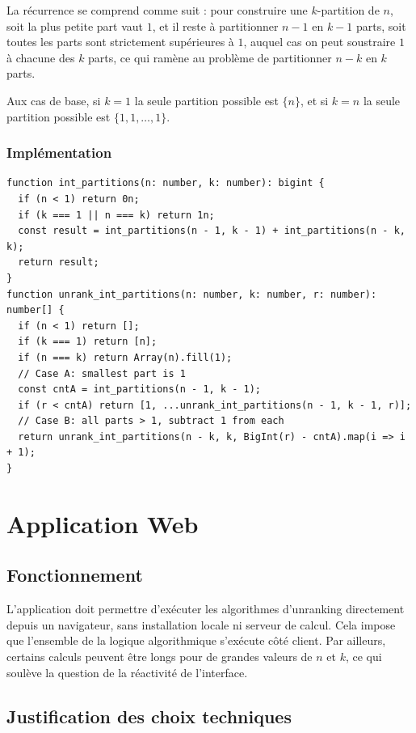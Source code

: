 \documentclass[12pt, a4paper]{report}
\begin{document}
La r\'ecurrence se comprend comme suit : pour construire une $k$-partition de $n$,
soit la plus petite part vaut $1$, et il reste \`a partitionner $n - 1$ en $k - 1$
parts, soit toutes les parts sont strictement sup\'erieures \`a $1$, auquel cas on
peut soustraire $1$ \`a chacune des $k$ parts, ce qui ram\`ene au probl\`eme de
partitionner $n - k$ en $k$ parts.

Aux cas de base, si $k = 1$ la seule partition possible est $\{n\}$, et si $k = n$
la seule partition possible est $\{1, 1, \ldots, 1\}$.

\subsection{Impl\'ementation}

\begin{verbatim}
function int_partitions(n: number, k: number): bigint {
  if (n < 1) return 0n;
  if (k === 1 || n === k) return 1n;
  const result = int_partitions(n - 1, k - 1) + int_partitions(n - k, k);
  return result;
}
function unrank_int_partitions(n: number, k: number, r: number): number[] {
  if (n < 1) return [];
  if (k === 1) return [n];
  if (n === k) return Array(n).fill(1);
  // Case A: smallest part is 1
  const cntA = int_partitions(n - 1, k - 1);
  if (r < cntA) return [1, ...unrank_int_partitions(n - 1, k - 1, r)];
  // Case B: all parts > 1, subtract 1 from each
  return unrank_int_partitions(n - k, k, BigInt(r) - cntA).map(i => i + 1);
}
\end{verbatim}

\chapter{Application Web}

\section{Fonctionnement}

L'application doit permettre d'ex\'ecuter les algorithmes d'unranking directement
depuis un navigateur, sans installation locale ni serveur de calcul. Cela impose
que l'ensemble de la logique algorithmique s'ex\'ecute c\^ot\'e client. Par
ailleurs, certains calculs peuvent \^etre longs pour de grandes valeurs de $n$ et
$k$, ce qui soul\`eve la question de la r\'eactivit\'e de l'interface.

\section{Justification des choix techniques}
\end{document}
